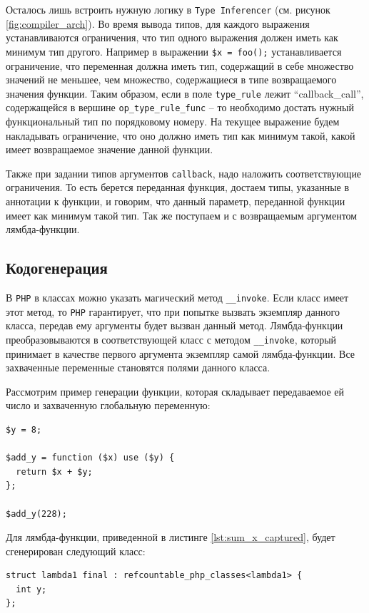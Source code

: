 Осталось лишь встроить нужную логику в \verb|Type Inferencer| (см. рисунок \ref{fig:compiler_arch}).
Во время вывода типов, для каждого выражения устанавливаются ограничения, что тип одного выражения должен иметь как минимум тип другого.
Например в выражении \verb|$x = foo();| устанавливается ограничение, что переменная должна иметь тип, содержащий в себе множество значений не меньшее, чем множество, содержащиеся в типе возвращаемого значения функции.
Таким образом, если в поле \verb|type_rule| лежит ``callback\_call'', содержащейся в вершине \verb|op_type_rule_func| -- то необходимо достать нужный функциональный тип по порядковому номеру.
На текущее выражение будем накладывать ограничение, что оно должно иметь тип как минимум такой, какой имеет возвращаемое значение данной функции.

Также при задании типов аргументов \verb|callback|, надо наложить соответствующие ограничения.
То есть берется переданная функция, достаем типы, указанные в аннотации к функции, и говорим, что данный параметр, переданной функции имеет как минимум такой тип.
Так же поступаем и с возвращаемым аргументом лямбда-функции.

\subsection{Кодогенерация}
В \verb|PHP| в классах можно указать магический метод \verb|__invoke|.
Если класс имеет этот метод, то \verb|PHP| гарантирует, что при попытке вызвать экземпляр данного класса, передав ему аргументы будет вызван данный метод.
Лямбда-функции преобразовываются в соответствующей класс с методом \verb|__invoke|, который принимает в качестве первого аргумента экземпляр самой лямбда-функции.
Все захваченные переменные становятся полями данного класса.

Рассмотрим пример генерации функции, которая складывает передаваемое ей число и захваченную глобальную переменную:
\begin{lstlisting}[label={lst:sum_x_captured},caption={Пример функции, добавляющей к аргументу захваченное значение}]
$y = 8;

$add_y = function ($x) use ($y) {
  return $x + $y;
};

$add_y(228);
\end{lstlisting}

Для лямбда-функции, приведенной в листинге \ref{lst:sum_x_captured}, будет сгенерирован следующий класс:
\begin{lstlisting}
struct lambda1 final : refcountable_php_classes<lambda1> {
  int y;
};
\end{lstlisting}

